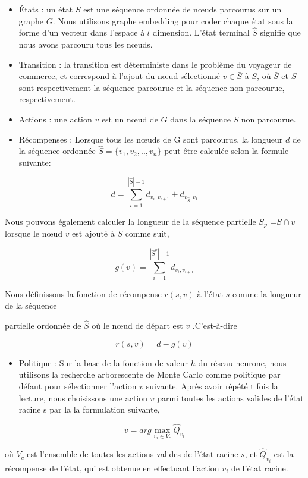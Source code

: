 \documentclass[]{article}
\begin{document}
\begin{itemize}
\item
  États : un état \(S\) est une séquence ordonnée de nœuds parcourus sur
  un graphe \(G\). Nous utilisons graphe embedding pour coder chaque
  état sous la forme d'un vecteur dans l'espace à \(l\) dimension.
  L'état terminal \(\hat{S}\) signifie que nous avons parcouru tous les
  nœuds.
\item
  Transition : la transition est déterministe dans le problème du
  voyageur de commerce, et correspond à l'ajout du nœud sélectionné
  \(v ∈ \bar{S}\) à \(S\), où \(\bar{S}\) et \(S \) sont respectivement
  la séquence parcourue et la séquence non parcourue, respectivement.
\item
  Actions : une action \(v\) est un nœud de \(G\) dans la séquence
  \(\bar{S}\) non parcourue.
\item
  Récompenses : Lorsque tous les nœuds de G sont parcourus, la longueur
  \(d\) de la séquence ordonnée \(\hat{S}= \{v_1 , v_2 , .., v_n \}\)
  peut être calculée selon la formule suivante:
\end{itemize}

\[d = \sum_{i=1}^{|\hat{S}|-1}d_{v_i,v_{i+1}} +d_{v_{\hat{S}},v_1}\]

Nous pouvons également calculer la longueur de la séquence partielle
\(S_p\) =\(S ∩ v\) lorsque le nœud \(v\) est ajouté à \(S\) comme suit,

\[g(v) =\sum_{i=1}^{|\hat{S}^p|-1}d_{v_i,v_{i+1}}\]

Nous définissons la fonction de récompense \( r(s, v)\) à l'état \(s\)
comme la longueur de la séquence

partielle ordonnée de \(\hat{S}\) où le nœud de départ est \(v\)
.C'est-à-dire

\[r(s,v)=d-g(v)\]

\begin{itemize}
\item
  Politique : Sur la base de la fonction de valeur \(h\) du réseau
  neurone, nous utilisons la recherche arborescente de Monte Carlo comme
  politique par défaut pour sélectionner l'action \(v\) suivante. Après
  avoir répété t fois la lecture, nous choisissons une action \(v\)
  parmi toutes les actions valides de l'état racine s par la la
  formulation suivante,
\end{itemize}

\[v=arg\max_{v_i\in V_c} \hat{Q}_{v_i}\]

où \(V_c\) est l'ensemble de toutes les actions valides de l'état racine
\(s\), et \( \hat{Q}_{v_i}\) est la récompense de l'état, qui est
obtenue en effectuant l'action \(v_i\) de l'état racine.
\end{document}
